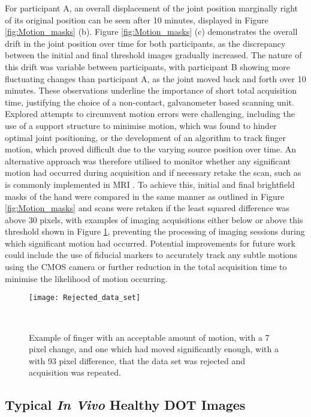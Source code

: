 \documentclass[twoside]{bhamthesis}
\theoremstyle{definition}
\begin{document}
For participant A, an overall displacement of the joint position marginally right of its original position can be seen after 10 minutes, displayed in Figure \ref{fig:Motion_masks} (b). Figure \ref{fig:Motion_masks} (c) demonstrates the overall drift in the joint position over time for both participants, as the discrepancy between the initial and final threshold images gradually increased. The nature of this drift was variable between participants, with participant B showing more fluctuating changes than participant A, as the joint moved back and forth over 10 minutes. These observations underline the importance of short total acquisition time, justifying the choice of a non-contact, galvanometer based scanning unit. Explored attempts to circumvent motion errors were challenging, including the use of a support structure to minimise motion, which was found to hinder optimal joint positioning, or the development of an algorithm to track finger motion, which proved difficult due to the varying source position over time. An alternative approach was therefore utilised to monitor whether any significant motion had occurred during acquisition and if necessary retake the scan, such as is commonly implemented in MRI \cite{dosenbach2017real}. To achieve this, initial and final brightfield masks of the hand were compared in the same manner as outlined in Figure \ref{fig:Motion_masks} and scans were retaken if the least squared difference was above 30 pixels, with examples of imaging acquisitions either below or above this threshold shown in Figure \ref{fig:Rejected_data_set}, preventing the processing of imaging sessions during which significant motion had occurred. Potential improvements for future work could include the use of fiducial markers to accurately track any subtle motions using the CMOS camera or further reduction in the total acquisition time to minimise the likelihood of motion occurring. 

\begin{figure}[!ht]
\texttt{[image: Rejected\_data\_set]}
\centering
\caption{Example of finger with an acceptable amount of motion, with a 7 pixel change, and one which had moved significantly enough, with a with 93 pixel difference, that the data set was rejected and acquisition was repeated.}
  \label{fig:Rejected_data_set}\
\end{figure}

\subsection{Typical \textit{In Vivo} Healthy DOT Images}
\label{Typical Healthy}
\end{document}
